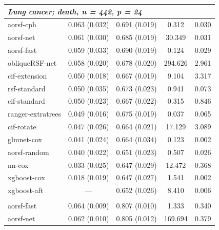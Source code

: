 \documentclass{article}\usepackage[]{graphicx}\usepackage[]{xcolor}
\newenvironment{knitrout}{}{} %
\begin{document}
\begin{knitrout}
\begin{longtable}[t]{lcccc}
\multicolumn{5}{l}{\textit{\textbf{Lung cancer; death, n = 442, p = 24}}}\\
\hline
\hspace{1em}aorsf-cph & 0.063 (0.032) & 0.691 (0.019) & 0.312 & 0.030\\
\hspace{1em}aorsf-net & 0.061 (0.030) & 0.685 (0.019) & 30.349 & 0.031\\
\hspace{1em}aorsf-fast & 0.059 (0.033) & 0.690 (0.019) & 0.124 & 0.029\\
\hspace{1em}obliqueRSF-net & 0.058 (0.020) & 0.678 (0.020) & 294.626 & 2.961\\
\hspace{1em}cif-extension & 0.050 (0.018) & 0.667 (0.019) & 9.104 & 3.317\\
\hspace{1em}rsf-standard & 0.050 (0.035) & 0.673 (0.023) & 0.941 & 0.073\\
\hspace{1em}cif-standard & 0.050 (0.023) & 0.667 (0.022) & 0.315 & 0.846\\
\hspace{1em}ranger-extratrees & 0.049 (0.016) & 0.675 (0.019) & 0.037 & 0.065\\
\hspace{1em}cif-rotate & 0.047 (0.026) & 0.664 (0.021) & 17.129 & 3.089\\
\hspace{1em}glmnet-cox & 0.041 (0.024) & 0.664 (0.034) & 0.123 & 0.002\\
\hspace{1em}aorsf-random & 0.040 (0.022) & 0.651 (0.023) & 0.507 & 0.026\\
\hspace{1em}nn-cox & 0.033 (0.025) & 0.647 (0.029) & 12.472 & 0.368\\
\hspace{1em}xgboost-cox & 0.018 (0.019) & 0.647 (0.027) & 1.541 & 0.002\\
\hspace{1em}xgboost-aft & --- & 0.652 (0.026) & 8.410 & 0.006\\
\addlinespace[0.3em]
\multicolumn{5}{l}{\textit{\textbf{MESA; coronary heart disease, n = 6785, p = 48}}}\\
\hline
\hspace{1em}aorsf-fast & 0.064 (0.009) & 0.807 (0.010) & 1.333 & 0.340\\
\hspace{1em}aorsf-net & 0.062 (0.010) & 0.805 (0.012) & 169.694 & 0.379\\

\end{longtable}
\end{knitrout}
\end{document}
